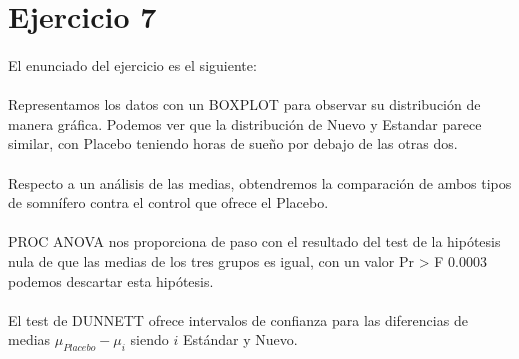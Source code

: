 \documentclass{article}
\begin{document}
  \maketitle

  \section{Ejercicio 7}

    \paragraph{}
    El enunciado del ejercicio es el siguiente: 

    \paragraph{}
    Representamos los datos con un BOXPLOT para observar su distribución de manera gráfica. Podemos ver que la distribución de Nuevo y Estandar parece similar, con Placebo teniendo horas de sueño por debajo de las otras dos.

    \paragraph{}
    Respecto a un análisis de las medias, obtendremos la comparación de ambos tipos de somnífero contra el control que ofrece el Placebo.

    \paragraph{}
    PROC ANOVA nos proporciona de paso con el resultado del test de la hipótesis nula de que las medias de los tres grupos es igual, con un valor Pr > F 0.0003 podemos descartar esta hipótesis.

    \paragraph{}
    El test de DUNNETT ofrece intervalos de confianza para las diferencias de medias $\mu_{Placebo} - \mu_{i}$ siendo $i$ Estándar y Nuevo.
\end{document}
